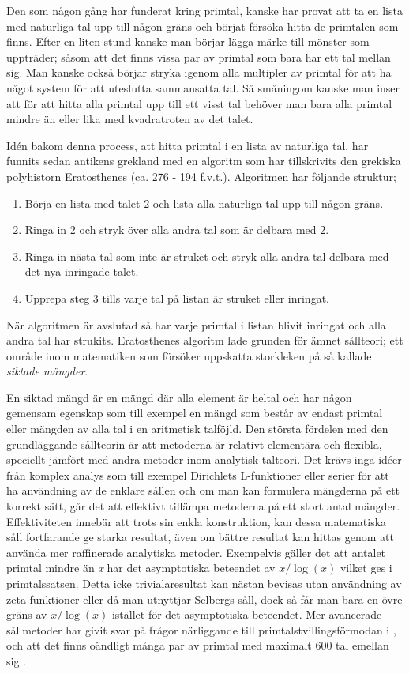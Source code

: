 Den som någon gång har funderat kring primtal, kanske har provat att ta en lista med naturliga tal upp till någon gräns och börjat försöka hitta de primtalen som finns. 
Efter en liten stund kanske man börjar lägga märke till mönster som uppträder; såsom att det finns vissa par av primtal som bara har ett tal mellan sig. 
Man kanske också börjar stryka igenom alla multipler av primtal för att ha något system för att uteslutta sammansatta tal.
Så småningom kanske man inser att för att hitta alla primtal upp till ett visst tal behöver man bara alla primtal mindre än eller lika med kvadratroten av det talet.

Idén bakom denna process, att hitta primtal i en lista av naturliga tal, har funnits sedan antikens grekland med en algoritm som har tillskrivits den grekiska polyhistorn Eratosthenes (ca. 276 - 194 f.v.t.). Algoritmen har följande struktur;
\begin{enumerate}
    \item Börja en lista med talet 2 och lista alla naturliga tal upp till någon gräns.
    \item Ringa in 2 och stryk över alla andra tal som är delbara med 2.
    \item Ringa in nästa tal som inte är struket och stryk alla andra tal delbara med det nya inringade talet.
    \item Upprepa steg 3 tills varje tal på listan är struket eller inringat. 
\end{enumerate}
När algoritmen är avslutad så har varje primtal i listan blivit inringat och alla andra tal har strukits. 
Eratosthenes algoritm lade grunden för ämnet sållteori; ett område inom matematiken som försöker uppskatta storkleken på så kallade \textit{siktade mängder}. 

En siktad mängd är en mängd där alla element är heltal och har någon gemensam egenskap som till exempel en mängd som består av endast primtal eller mängden av alla tal i en aritmetisk talföjld.
Den största fördelen med den grundläggande sållteorin är att metoderna är relativt elementära och flexibla, speciellt jämfört med andra metoder inom analytisk talteori. 
Det krävs inga idéer från komplex analys som till exempel Dirichlets L-funktioner eller serier för att ha användning av de enklare sållen och om man kan formulera mängderna på ett korrekt sätt, går det att effektivt tillämpa metoderna på ett stort antal mängder. 
Effektiviteten innebär att trots sin enkla konstruktion, kan dessa matematiska såll fortfarande ge starka resultat, även om bättre resultat kan hittas genom att använda mer raffinerade analytiska metoder.
Exempelvis gäller det att antalet primtal mindre än \textit{x} har det asymptotiska beteendet av \(x/\log(x)\) vilket ges i primtalssatsen. 
Detta icke trivialaresultat kan nästan bevisas utan användning av zeta-funktioner eller då man utnyttjar Selbergs såll, dock så får man bara en övre gräns av \(x/\log(x)\) istället för det asymptotiska beteendet. 
Mer avancerade sållmetoder har givit svar på frågor närliggande till primtalstvillingsförmodan i \cite{chen2Prime}, och att det finns oändligt många par av primtal med maximalt 600 tal emellan sig \cite{mayBound}.


